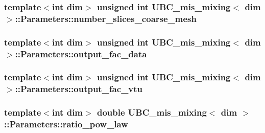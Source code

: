 \subsubsection[{number\+\_\+slices\+\_\+coarse\+\_\+mesh}]{\setlength{\rightskip}{0pt plus 5cm}template$<$int dim$>$ unsigned int {\bf U\+B\+C\+\_\+mis\+\_\+mixing}$<$ dim $>$\+::Parameters\+::number\+\_\+slices\+\_\+coarse\+\_\+mesh}\label{struct_u_b_c__mis__mixing_1_1_parameters_afd0d62eb8370ef34626e5ee3dac0e3a8}
\hypertarget{struct_u_b_c__mis__mixing_1_1_parameters_a5f77aeaec6daafeb048c81f8a422736d}{}
\subsubsection[{output\+\_\+fac\+\_\+data}]{\setlength{\rightskip}{0pt plus 5cm}template$<$int dim$>$ unsigned int {\bf U\+B\+C\+\_\+mis\+\_\+mixing}$<$ dim $>$\+::Parameters\+::output\+\_\+fac\+\_\+data}\label{struct_u_b_c__mis__mixing_1_1_parameters_a5f77aeaec6daafeb048c81f8a422736d}
\hypertarget{struct_u_b_c__mis__mixing_1_1_parameters_aa8503b9797f46dc16ba0fa2d7195a48f}{}
\subsubsection[{output\+\_\+fac\+\_\+vtu}]{\setlength{\rightskip}{0pt plus 5cm}template$<$int dim$>$ unsigned int {\bf U\+B\+C\+\_\+mis\+\_\+mixing}$<$ dim $>$\+::Parameters\+::output\+\_\+fac\+\_\+vtu}\label{struct_u_b_c__mis__mixing_1_1_parameters_aa8503b9797f46dc16ba0fa2d7195a48f}
\hypertarget{struct_u_b_c__mis__mixing_1_1_parameters_a3fd3d1dc26004ad858cd04ed0fa80867}{}
\subsubsection[{ratio\+\_\+pow\+\_\+law}]{\setlength{\rightskip}{0pt plus 5cm}template$<$int dim$>$ double {\bf U\+B\+C\+\_\+mis\+\_\+mixing}$<$ dim $>$\+::Parameters\+::ratio\+\_\+pow\+\_\+law}\label{struct_u_b_c__mis__mixing_1_1_parameters_a3fd3d1dc26004ad858cd04ed0fa80867}
\hypertarget{struct_u_b_c__mis__mixing_1_1_parameters_a1cb12452f4e62d63463960a293b6fcfe}{}
